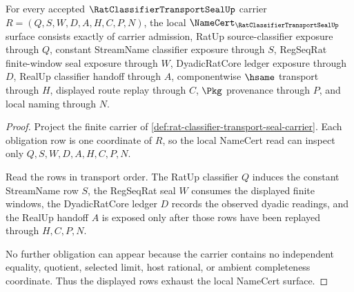 \begin{theorem}
\label{thm:rat-classifier-transport-seal-namecert-obligations}
For every accepted $\RatClassifierTransportSealUp$ carrier $R=(Q,S,W,D,A,H,C,P,N)$, the local $\NameCert_{\RatClassifierTransportSealUp}$ surface consists exactly of carrier admission, RatUp source-classifier exposure through $Q$, constant StreamName classifier exposure through $S$, RegSeqRat finite-window seal exposure through $W$, DyadicRatCore ledger exposure through $D$, RealUp classifier handoff through $A$, componentwise $\hsame$ transport through $H$, displayed route replay through $C$, $\Pkg$ provenance through $P$, and local naming through $N$.
\end{theorem}
\begin{proof}
Project the finite carrier of \autoref{def:rat-classifier-transport-seal-carrier}. Each obligation row is one coordinate of $R$, so the local NameCert read can inspect only $Q,S,W,D,A,H,C,P,N$.

Read the rows in transport order. The RatUp classifier $Q$ induces the constant StreamName row $S$, the RegSeqRat seal $W$ consumes the displayed finite windows, the DyadicRatCore ledger $D$ records the observed dyadic readings, and the RealUp handoff $A$ is exposed only after those rows have been replayed through $H,C,P,N$.

No further obligation can appear because the carrier contains no independent equality, quotient, selected limit, host rational, or ambient completeness coordinate. Thus the displayed rows exhaust the local NameCert surface.
\end{proof}

